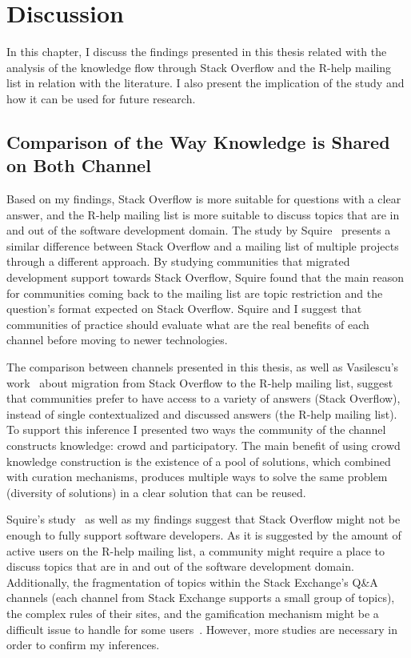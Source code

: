 \documentclass{sig-alternate-05-2015}
\begin{document}
\section{Discussion}
\label{cha:discussion}

	In this chapter, I discuss the findings presented in this thesis related with the analysis of the knowledge flow through Stack Overflow and the R-help mailing list in relation with the literature. 
	I also present the implication of the study and how it can be used for future research.

\subsection{Comparison of the Way Knowledge is Shared on Both Channel}

	Based on my findings, Stack Overflow is more suitable for questions with a clear answer, and the R-help mailing list is more suitable to discuss topics that are in and out of the software development domain.
	The study by Squire~\cite{Squire2015a} presents a similar difference between Stack Overflow and a mailing list of multiple projects through a different approach. 
	By studying communities that migrated development support towards Stack Overflow, Squire found that the main reason for communities coming back to the mailing list are topic restriction and the question's format expected on Stack Overflow.
	Squire and I suggest that communities of practice should evaluate what are the real benefits of each channel before moving to newer technologies.

	The comparison between channels presented in this thesis, as well as Vasilescu's work~\cite{Vasilescu2014c} about migration from Stack Overflow to the R-help mailing list, suggest that communities prefer to have access to a variety of answers (Stack Overflow), instead of single contextualized and discussed answers (the R-help mailing list). 
	To support this inference I presented two ways the community of the channel constructs knowledge: crowd and participatory. 
	The main benefit of using crowd knowledge construction is the existence of a pool of solutions, which combined with curation mechanisms, produces multiple ways to solve the same problem (diversity of solutions) in a clear solution that can be reused.

	Squire's study~\cite{Squire2015a} as well as my findings suggest that Stack Overflow might not be enough to fully support software developers.
	As it is suggested by the amount of active users on the R-help mailing list, a community might require a place to discuss topics that are in and out of the software development domain.
	Additionally, the fragmentation of topics within the Stack Exchange's Q\&A channels (each channel from Stack Exchange supports a small group of topics), the complex rules of their sites, and the gamification mechanism might be a difficult issue to handle for some users~\cite{Vasilescu2013}.
	However, more studies are necessary in order to confirm my inferences. 
\end{document}
